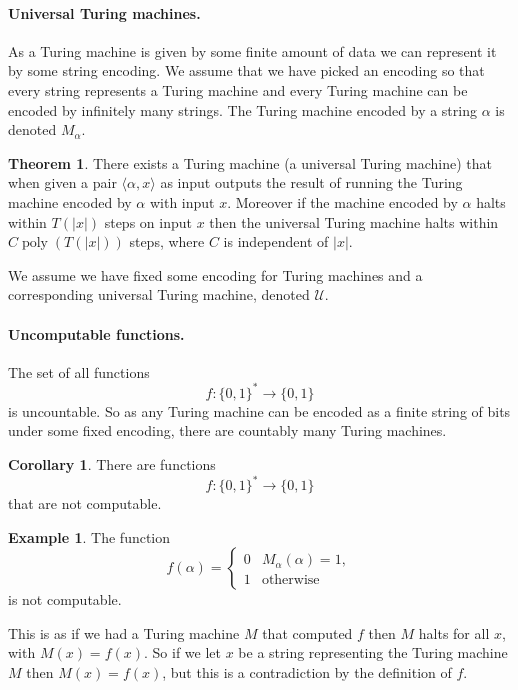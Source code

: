 \documentclass[11pt,a4paper]{article}
\theoremstyle{definition}
\newtheorem{thm}{Theorem}
\newtheorem{cor}{Corollary}
\newtheorem*{ex}{Example}
\newcommand{\U}{\mathcal{U}}
\DeclareMathOperator{\poly}{poly}
\begin{document}
\paragraph{Universal Turing machines.}
As a Turing machine is given by some finite amount of data we can represent it by some string encoding.
We assume that we have picked an encoding so that every string represents a Turing machine and every Turing machine can be encoded by infinitely many strings.
The Turing machine encoded by a string $\alpha$ is denoted $M_\alpha$.
\begin{thm}
There exists a Turing machine (a universal Turing machine) that when given a pair $\langle \alpha,x\rangle$ as input outputs the result of running the Turing machine encoded by $\alpha$ with input $x$.
Moreover if the machine encoded by $\alpha$ halts within $T(|x|)$ steps on input $x$ then the universal Turing machine halts within $C\poly(T(|x|))$ steps, where $C$ is independent of $|x|$.
\end{thm}

We assume we have fixed some encoding for Turing machines and a corresponding universal Turing machine, denoted $\U$.

\paragraph{Uncomputable functions.}
The set of all functions
\[
f\colon\{0,1\}^*\to\{0,1\}
\]
is uncountable.
So as any Turing machine can be encoded as a finite string of bits under some fixed encoding, there are countably many Turing machines.
\begin{cor}
There are functions
\[
f\colon\{0,1\}^*\to\{0,1\}
\]
that are not computable.
\end{cor}

\begin{ex}\label{firstuncomp}
The function
\[
f(\alpha) =\begin{cases} 0 & M_\alpha (\alpha) = 1,\\
1 &\text{otherwise}
\end{cases}
\]
is not computable.

This is as if we had a Turing machine $M$ that computed $f$ then $M$ halts for all $x$, with $M(x) = f(x)$.
So if we let $x$ be a string representing the Turing machine $M$ then $M(x) = f(x)$, but this is a contradiction by the definition of $f$.
\end{ex}
\end{document}
